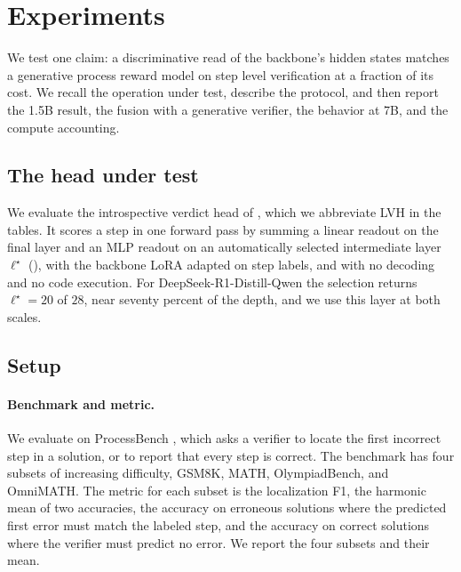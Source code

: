
\section{Experiments}
\label{sec:experiments}

We test one claim: a discriminative read of the backbone's hidden states matches a generative process reward model on step level verification at a fraction of its cost. We recall the operation under test, describe the protocol, and then report the 1.5B result, the fusion with a generative verifier, the behavior at 7B, and the compute accounting.

\subsection{The head under test}
\label{sec:exp-head}

We evaluate the introspective verdict head of , which we abbreviate LVH in the tables. It scores a step in one forward pass by summing a linear readout on the final layer and an MLP readout on an automatically selected intermediate layer $\ell^\star$ (), with the backbone LoRA adapted on step labels, and with no decoding and no code execution. For DeepSeek-R1-Distill-Qwen the selection returns $\ell^\star=20$ of $28$, near seventy percent of the depth, and we use this layer at both scales.

\subsection{Setup}
\label{sec:exp-setup}

\paragraph{Benchmark and metric.} We evaluate on ProcessBench \citep{zheng2024processbench}, which asks a verifier to locate the first incorrect step in a solution, or to report that every step is correct. The benchmark has four subsets of increasing difficulty, GSM8K, MATH, OlympiadBench, and OmniMATH. The metric for each subset is the localization F1, the harmonic mean of two accuracies, the accuracy on erroneous solutions where the predicted first error must match the labeled step, and the accuracy on correct solutions where the verifier must predict no error. We report the four subsets and their mean.

